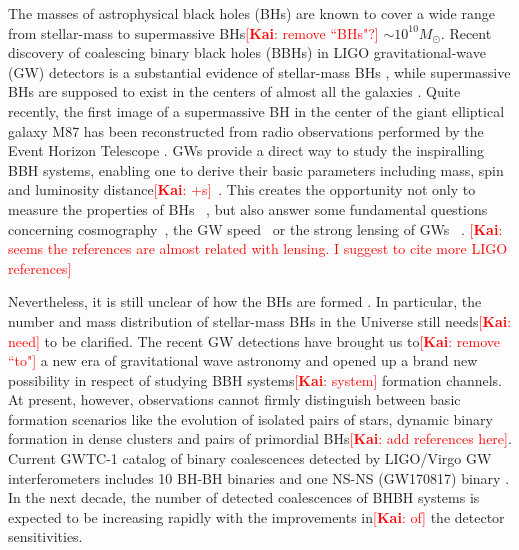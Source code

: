 \documentclass[twocolumn]{aastex62}
\newcommand{\kai}[1]{\textcolor{red}{[{\bf Kai}: #1]}}
\begin{document}
The masses of astrophysical black holes (BHs) are known to cover a wide range from stellar-mass to supermassive BHs\kai{remove ``BHs"?} $\sim10^{10} M_{\odot}$. Recent discovery of 
coalescing binary black holes (BBHs) in LIGO gravitational-wave (GW) detectors is a substantial evidence of stellar-mass BHs \citep{Abbott2016}, while supermassive BHs are supposed to exist in the centers of almost all the galaxies \citep{Lynden-Bell1969, Kormendy1995}. Quite recently, the first image of a supermassive BH in the center of the giant elliptical galaxy M87 has been reconstructed from radio observations performed by the Event Horizon Telescope \citep{Alberdi2019}. 
GWs provide a direct way to study the inspiralling BBH systems, enabling one to derive their basic parameters including mass, spin and luminosity distance\kai{+s}~\citep{Abbott2017phy}. This creates the opportunity not only to measure the properties of BHs ~\citep{Abbott2018b}, but also answer some fundamental questions concerning cosmography~\citep{Liao2017, Ding2019, Cai2017}, the GW speed~\citep{Fan2017, Collett2017} or the strong lensing of GWs ~\citep{Ola2013, Biesiada2014, Ding2015}. \kai{seems the references are almost related with lensing. I suggest to cite more LIGO references}

Nevertheless, it is still unclear of how the BHs are formed \citep{Fryer1999, Fryer2001, Mirabel2016}. In particular, the number and mass distribution of stellar-mass BHs in the Universe still needs\kai{need} to be clarified.
The recent GW detections have brought us to\kai{remove ``to"} a new era of gravitational wave astronomy \citep[e.g.,][]{Abbott2016, Abbott2016_sum, Abbott2018} and opened up a  brand new possibility in respect of studying BBH systems\kai{system} formation channels. 
At present, however, observations cannot firmly distinguish between basic formation scenarios like the evolution of isolated pairs of stars, dynamic binary
formation in dense clusters and pairs of primordial BHs\kai{add references here}.
Current GWTC-1 catalog of binary coalescences detected by LIGO/Virgo GW interferometers includes 10 BH-BH binaries and one NS-NS (GW170817) binary \citep{Abbott2018}. In the next decade, the number of detected coalescences of BHBH systems is expected to be increasing rapidly with the improvements in\kai{of} the detector sensitivities. 
\end{document}
